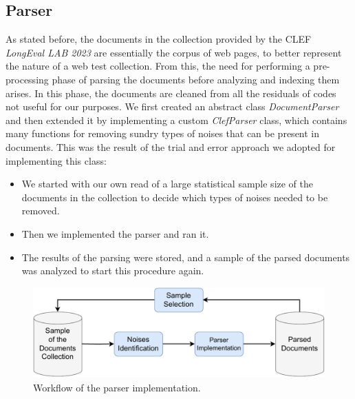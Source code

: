 \subsection{Parser} \label{parser_subsec}
As stated before, the documents in the collection provided by the \ac{CLEF} \textit{LongEval LAB 2023} \cite{cleflongeval} are essentially the corpus of web pages, to better represent the nature of a web test collection.
From this, the need for performing a pre-processing phase of parsing the documents before analyzing and indexing them arises.
In this phase, the documents are cleaned from all the residuals of codes not useful for our purposes. 
We first created an abstract class \textit{DocumentParser} and then extended it by implementing a custom \textit{ClefParser} class, which contains many functions for removing sundry types of noises that can be present in documents. 
This was the result of the trial and error approach we adopted for implementing this class:
\begin{itemize}
\item We started with our own read of a large statistical sample size of the documents in the collection to decide which types of noises needed to be removed.
\item Then we implemented the parser and ran it.
\item The results of the parsing were stored, and a sample of the parsed documents was analyzed to start this procedure again.
\end{itemize}

\begin{figure}[!h]
    \centering
    \includegraphics[width=0.8\linewidth]{figure/Parser_implementation_workflow.pdf}
    \caption{Workflow of the parser implementation.}
    \label{fig:Parser_implementation_workflow}
\end{figure}


